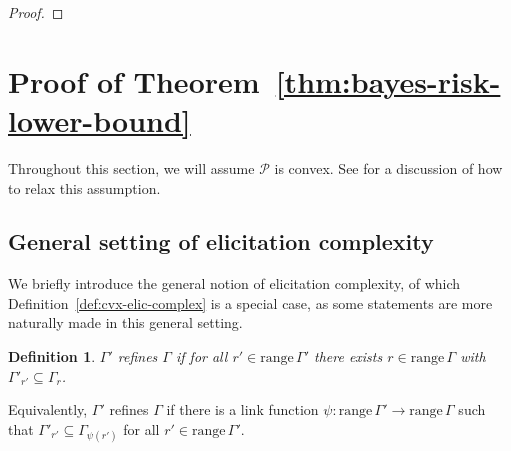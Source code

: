 \documentclass{article} %
\newcommand{\reals}{\mathbb{R}}
\newcommand{\simplex}{\Delta_\Y}
\newcommand{\range}{\mathrm{range}\,}
\renewcommand{\P}{\mathcal{P}}
\newcommand{\Sc}{\mathcal{S}}  %
\newcommand{\Y}{\mathcal{Y}}
\newtheorem{definition}{Definition}
\begin{document}
\begin{proof}
\end{proof}

\section{Proof of Theorem~\ref{thm:bayes-risk-lower-bound}}\label{app:pf-bayesrisklowerbound}

\newcommand{\EL}{\mathcal{E}}
\newcommand{\defeq}{:=}
\newcommand{\conv}{\mathrm{conv}}

Throughout this section, we will assume $\P$ is convex.
See \citet[\S E.5]{frongillo2020elicitation} for a discussion of how to relax this assumption.

\subsection{General setting of elicitation complexity}

We briefly introduce the general notion of elicitation complexity, of which Definition~\ref{def:cvx-elic-complex} is a special case, as some statements are more naturally made in this general setting.

\begin{definition}
  \label{def:refine}
  $\Gamma'$ \emph{refines} $\Gamma$ if for all $r'\in\range\Gamma'$ there exists $r\in\range\Gamma$ with $\Gamma'_{r'} \subseteq \Gamma_r$.
\end{definition}
Equivalently, $\Gamma'$ refines $\Gamma$ if there is a link function $\psi:\range\Gamma'\to\range\Gamma$ such that $\Gamma'_{r'} \subseteq \Gamma_{\psi(r')}$ for all $r'\in\range\Gamma'$.
\end{document}
